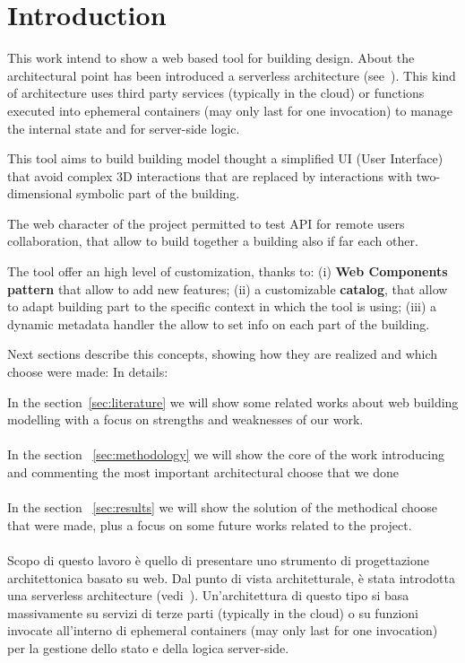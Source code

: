 \section{Introduction}

This work intend to show a web based tool for building design. About the architectural point has been introduced a serverless architecture (see~\cite{Roberts}). This kind of architecture uses third party services (typically in the cloud) or functions executed into ephemeral containers (may only last for one invocation) to manage the internal state and for server-side logic.

This tool aims to build building model thought a simplified UI (User Interface) that avoid complex 3D interactions that are replaced by interactions with two-dimensional symbolic part of the building.

The web character of the project permitted to test API for remote users collaboration, that allow to build together a building also if far each other.

The tool offer an high level of customization, thanks to: (i) \textbf{Web Components pattern} that allow to add new features; (ii) a customizable \textbf{catalog}, that allow to adapt building part to the specific context in which the tool is using; (iii) a dynamic metadata handler the allow to set info on each part of the building.

Next sections describe this concepts, showing how they are realized and which choose were made:
 In details:

In the section~\ref{sec:literature} we will show some related works about web building modelling with a focus on strengths and weaknesses of our work.\\\\
In the section ~\ref{sec:methodology} we will show the core of the work introducing and commenting the most important architectural choose that we done\\\\
In the section ~\ref{sec:results} we will show the solution of the methodical choose that were made, plus a focus on some future works related to the project.\\\\



Scopo di questo lavoro \`e quello di presentare uno strumento di progettazione architettonica basato su web. Dal punto di vista architetturale, \`e stata introdotta una serverless architecture (vedi~\cite{Roberts}). Un'architettura di questo tipo si basa massivamente su servizi di terze parti (typically in the cloud) o su funzioni invocate all'interno di ephemeral containers (may only last for one invocation) per la gestione dello stato e della logica server-side.

